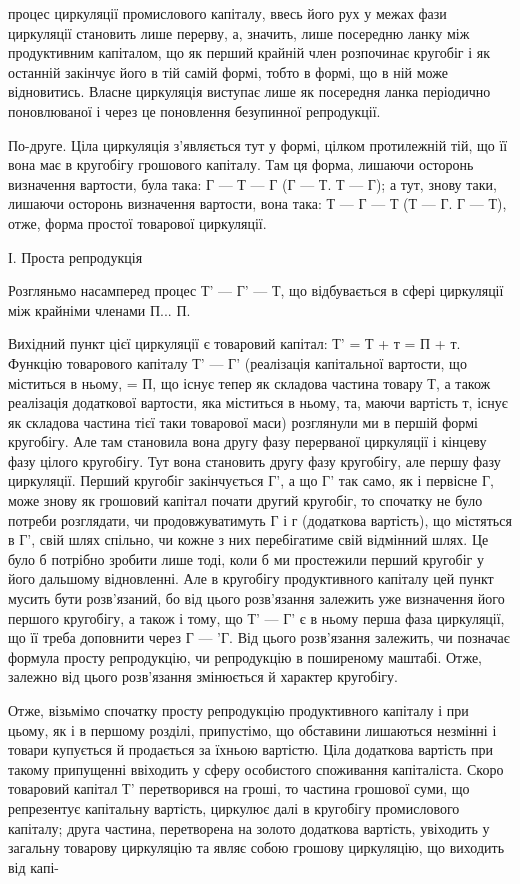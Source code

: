 процес циркуляції промислового капіталу, ввесь його рух у межах фази
циркуляції становить лише перерву, а, значить, лише посередню ланку між
продуктивним капіталом, що як перший крайній член розпочинає кругобіг
і як останній закінчує його в тій самій формі, тобто в формі, що в ній
може відновитись. Власне циркуляція виступає лише як посередня ланка
періодично поновлюваної і через це поновлення безупинної репродукції.

По-друге. Ціла циркуляція з'являється тут у формі, цілком протилежній
тій, що її вона має в кругобігу грошового капіталу. Там ця форма,
лишаючи осторонь визначення вартости, була така: Г — Т — Г (Г — Т.
Т — Г); а тут, знову таки, лишаючи осторонь визначення вартости, вона
така: Т — Г — Т (Т — Г. Г — Т), отже, форма простої товарової циркуляції.

І. Проста репродукція

Розгляньмо насамперед процес Т' — Г' — Т, що відбувається в сфері
циркуляції між крайніми членами П... П.

Вихідний пункт цієї циркуляції є товаровий капітал: Т' = Т + т
= П + т. Функцію товарового капіталу Т' — Г' (реалізація капітальної вартости,
що міститься в ньому, = П, що існує тепер як складова частина
товару Т, а також реалізація додаткової вартости, яка міститься в
ньому, та, маючи вартість т, існує як складова частина тієї таки
товарової маси) розглянули ми в першій формі кругобігу. Але там становила
вона другу фазу перерваної циркуляції і кінцеву фазу цілого кругобігу.
Тут вона становить другу фазу кругобігу, але першу фазу циркуляції.
Перший кругобіг закінчується Г', а що Г' так само, як і первісне
Г, може знову як грошовий капітал почати другий кругобіг, то спочатку
не було потреби розглядати, чи продовжуватимуть Г і г (додаткова
вартість), що містяться в Г', свій шлях спільно, чи кожне з них перебігатиме
свій відмінний шлях. Це було б потрібно зробити лише тоді,
коли б ми простежили перший кругобіг у його дальшому відновленні.
Але в кругобігу продуктивного капіталу цей пункт мусить бути розв’язаний,
бо від цього розв’язання залежить уже визначення його першого
кругобігу, а також і тому, що Т' — Г' є в ньому перша фаза циркуляції,
що її треба доповнити через Г — 'Г. Від цього розв’язання залежить,
чи позначає формула просту репродукцію, чи репродукцію в поширеному
маштабі. Отже, залежно від цього розв’язання змінюється й характер
кругобігу.

Отже, візьмімо спочатку просту репродукцію продуктивного капіталу
і при цьому, як і в першому розділі, припустімо, що обставини лишаються
незмінні і товари купується й продається за їхньою вартістю. Ціла
додаткова вартість при такому припущенні ввіходить у сферу особистого
споживання капіталіста. Скоро товаровий капітал Т' перетворився на
гроші, то частина грошової суми, що репрезентує капітальну вартість,
циркулює далі в кругобігу промислового капіталу; друга частина, перетворена
на золото додаткова вартість, увіходить у загальну товарову
циркуляцію та являє собою грошову циркуляцію, що виходить від капі-
